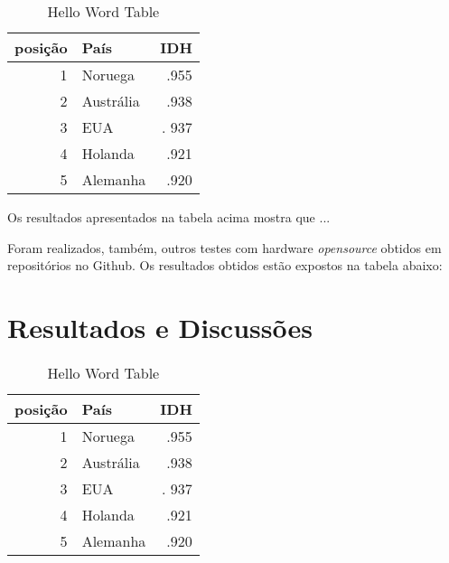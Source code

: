 \documentclass[12pt, twocolumn, a4paper]{article}
\begin{document}
\begin{table}[h]
\centering
\caption{Hello Word Table}
	\begin{tabular}{r|l|r}
	\hline
	posição & País & IDH\\
	\hline
	1 & Noruega        & .955 \\
	\hline
	2 & Austrália 	   & .938 \\
	\hline
	3 & EUA            &. 937 \\
	\hline
	4 & Holanda        & .921 \\
	\hline
	5 & Alemanha       & .920 \\
	\hline
	
	\end{tabular}

\end{table}

\quad Os resultados apresentados na tabela acima mostra que ...

	Foram realizados, também, outros testes com hardware \textit{opensource} obtidos em repositórios no Github. Os resultados obtidos estão expostos na tabela abaixo:
	\section{Resultados e Discussões}
	
	\begin{table}[h]
\centering
\caption{Hello Word Table}
	\begin{tabular}{r|l|r}
	\hline
	posição & País & IDH\\
	\hline
	1 & Noruega        & .955 \\
	\hline
	2 & Austrália 	   & .938 \\
	\hline
	3 & EUA            &. 937 \\
	\hline
	4 & Holanda        & .921 \\
	\hline
	5 & Alemanha       & .920 \\
	\hline
	
	\end{tabular}

\end{table}



	
  
	
	
	
\end{document}
